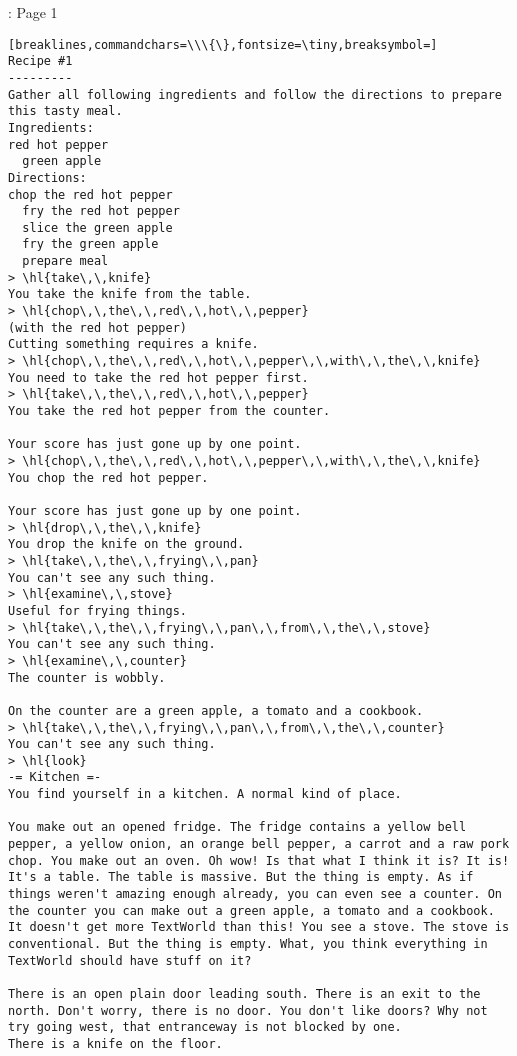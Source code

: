 \begin{AIbox}[width=0.9\textwidth]{\DV: Page 1}
\begin{Verbatim}[breaklines,commandchars=\\\{\},fontsize=\tiny,breaksymbol=]
Recipe #1
---------
Gather all following ingredients and follow the directions to prepare this tasty meal.
Ingredients:
red hot pepper
  green apple
Directions:
chop the red hot pepper
  fry the red hot pepper
  slice the green apple
  fry the green apple
  prepare meal
> \hl{take\,\,knife}
You take the knife from the table.
> \hl{chop\,\,the\,\,red\,\,hot\,\,pepper}
(with the red hot pepper)
Cutting something requires a knife.
> \hl{chop\,\,the\,\,red\,\,hot\,\,pepper\,\,with\,\,the\,\,knife}
You need to take the red hot pepper first.
> \hl{take\,\,the\,\,red\,\,hot\,\,pepper}
You take the red hot pepper from the counter.

Your score has just gone up by one point.
> \hl{chop\,\,the\,\,red\,\,hot\,\,pepper\,\,with\,\,the\,\,knife}
You chop the red hot pepper.

Your score has just gone up by one point.
> \hl{drop\,\,the\,\,knife}
You drop the knife on the ground.
> \hl{take\,\,the\,\,frying\,\,pan}
You can't see any such thing.
> \hl{examine\,\,stove}
Useful for frying things.
> \hl{take\,\,the\,\,frying\,\,pan\,\,from\,\,the\,\,stove}
You can't see any such thing.
> \hl{examine\,\,counter}
The counter is wobbly.

On the counter are a green apple, a tomato and a cookbook.
> \hl{take\,\,the\,\,frying\,\,pan\,\,from\,\,the\,\,counter}
You can't see any such thing.
> \hl{look}
-= Kitchen =-
You find yourself in a kitchen. A normal kind of place.

You make out an opened fridge. The fridge contains a yellow bell pepper, a yellow onion, an orange bell pepper, a carrot and a raw pork chop. You make out an oven. Oh wow! Is that what I think it is? It is! It's a table. The table is massive. But the thing is empty. As if things weren't amazing enough already, you can even see a counter. On the counter you can make out a green apple, a tomato and a cookbook. It doesn't get more TextWorld than this! You see a stove. The stove is conventional. But the thing is empty. What, you think everything in TextWorld should have stuff on it?

There is an open plain door leading south. There is an exit to the north. Don't worry, there is no door. You don't like doors? Why not try going west, that entranceway is not blocked by one.
There is a knife on the floor.
\end{Verbatim}
\end{AIbox}
